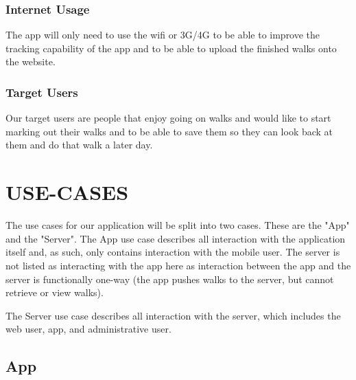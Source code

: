 \documentclass{project}
\begin{document}
\subsubsection{Internet Usage}
The app will only need to use the wifi or 3G/4G to be able to improve 
the tracking capability of the app and to be able to upload the finished walks onto the website.

\subsubsection{Target Users}
Our target users are people that enjoy going on walks and would like to start marking 
out their walks and to be able to save them so they can look back at them and do that walk a later day. 

\clearpage

\section{USE-CASES}

The use cases for our application will be split into two cases. These are the "App" and the "Server". The App use case describes all interaction with the application itself and, as such, only contains interaction with the mobile user. The server is not listed as interacting with the app here as interaction between the app and the server is functionally one-way (the app pushes walks to the server, but cannot retrieve or view walks).

The Server use case describes all interaction with the server, which includes the web 
user, app, and administrative user. 

\subsection{App}
\begin{figure}[H]
\end{figure}
\end{document}
